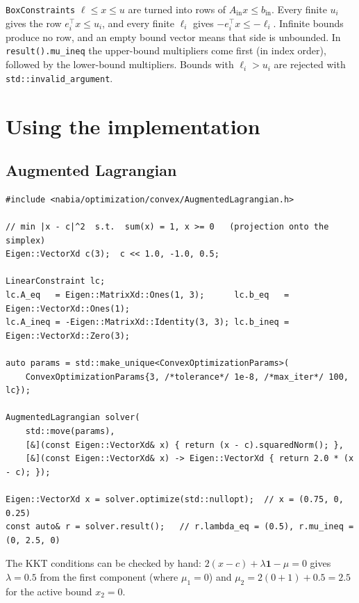 \documentclass[11pt,a4paper]{article}
\newcommand{\Ain}{A_{\mathrm{in}}}
\newcommand{\bin}{b_{\mathrm{in}}}
\begin{document}
\texttt{BoxConstraints} $\ell\le x\le u$ are turned into rows of $\Ain x\le\bin$.
Every finite $u_i$ gives the row $e_i^\top x\le u_i$, and every finite $\ell_i$ gives
$-e_i^\top x\le-\ell_i$. Infinite bounds produce no row, and an empty bound
vector means that side is unbounded. In \texttt{result().mu\_ineq} the upper-bound
multipliers come first (in index order), followed by the lower-bound
multipliers.
Bounds with $\ell_i>u_i$ are rejected with \texttt{std::invalid\_argument}.

\section{Using the implementation}

\subsection{Augmented Lagrangian}
\begin{lstlisting}
#include <nabia/optimization/convex/AugmentedLagrangian.h>

// min |x - c|^2  s.t.  sum(x) = 1, x >= 0   (projection onto the simplex)
Eigen::VectorXd c(3);  c << 1.0, -1.0, 0.5;

LinearConstraint lc;
lc.A_eq   = Eigen::MatrixXd::Ones(1, 3);      lc.b_eq   = Eigen::VectorXd::Ones(1);
lc.A_ineq = -Eigen::MatrixXd::Identity(3, 3); lc.b_ineq = Eigen::VectorXd::Zero(3);

auto params = std::make_unique<ConvexOptimizationParams>(
    ConvexOptimizationParams{3, /*tolerance*/ 1e-8, /*max_iter*/ 100, lc});

AugmentedLagrangian solver(
    std::move(params),
    [&](const Eigen::VectorXd& x) { return (x - c).squaredNorm(); },
    [&](const Eigen::VectorXd& x) -> Eigen::VectorXd { return 2.0 * (x - c); });

Eigen::VectorXd x = solver.optimize(std::nullopt);  // x = (0.75, 0, 0.25)
const auto& r = solver.result();   // r.lambda_eq = (0.5), r.mu_ineq = (0, 2.5, 0)
\end{lstlisting}
The KKT conditions can be checked by hand:
$2(x-c)+\lambda\mathbf{1}-\mu = 0$ gives $\lambda=0.5$ from the first
component (where $\mu_1=0$) and $\mu_2 = 2(0+1)+0.5=2.5$ for the active bound
$x_2=0$.
\end{document}
